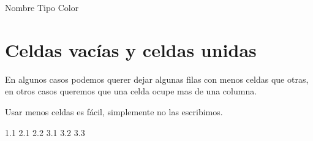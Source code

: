 \documentclass[letterpaper,10pt,spanish]{sphinxmanual}
\begin{document}
\begin{sphinxVerbatim}[commandchars=\\\{\}]
      Nombre
      Tipo
      Color
\end{sphinxVerbatim}




\section{Celdas vacías y celdas unidas}
\label{\detokenize{hay-tabla:celdas-vacias-y-celdas-unidas}}
En algunos casos podemos querer dejar algunas filas con menos celdas que otras,
en otros casos queremos que una celda ocupe mas de una columna.

Usar menos celdas es fácil, simplemente no las escribimos.

%
\begin{sphinxVerbatim}[commandchars=\\\{\}]
 
      1.1
      2.1
      2.2
      3.1
      3.2
      3.3
\end{sphinxVerbatim}
\end{document}
